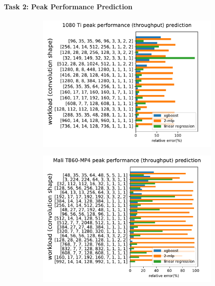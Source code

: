 \paragraph{Task 2: Peak Performance Prediction}
\begin{figure}[ht]
\begin{center}
 \begin{subfigure}[]{\textwidth}
\includegraphics[width=\textwidth]{sys_figures/cuda_1080ti_binary_throughput.pdf}
\label{fig:peak1080ti}
\end{subfigure}
\end{center}
\begin{center}
 \begin{subfigure}[]{\textwidth}
\includegraphics[width=\textwidth]{sys_figures/mali_rk3399_binary_throughput.pdf}

\end{subfigure}
\end{center}
\end{figure}
